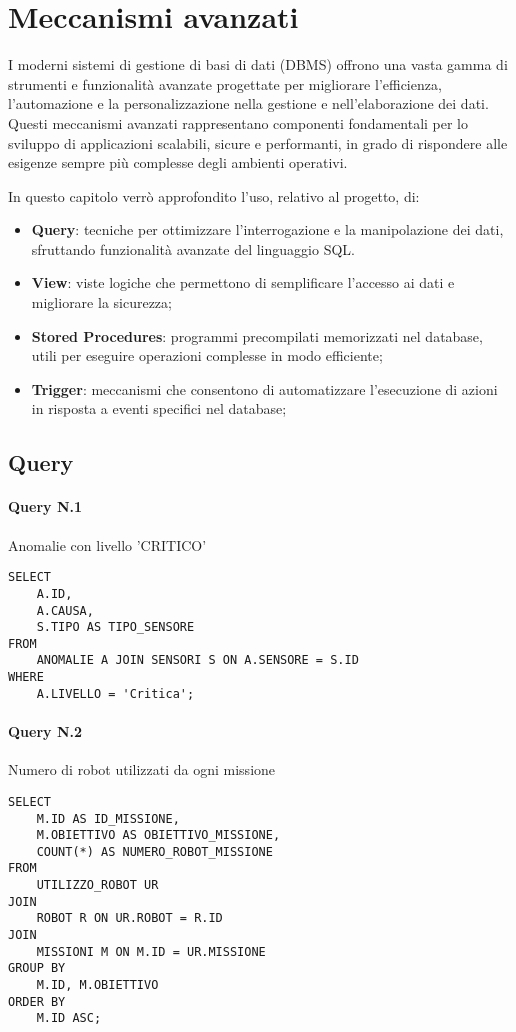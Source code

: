 \section{Meccanismi avanzati}

I moderni sistemi di gestione di basi di dati (DBMS) offrono una vasta gamma di strumenti e funzionalità avanzate progettate per migliorare l'efficienza, l'automazione e la personalizzazione nella gestione e nell'elaborazione dei dati. Questi meccanismi avanzati rappresentano componenti fondamentali per lo sviluppo di applicazioni scalabili, sicure e performanti, in grado di rispondere alle esigenze sempre più complesse degli ambienti operativi.

In questo capitolo verrò approfondito l'uso, relativo al progetto, di:
\begin{itemize}
    \item \textbf{Query}: tecniche per ottimizzare l'interrogazione e la manipolazione dei dati, sfruttando funzionalità avanzate del linguaggio SQL.
    \item \textbf{View}: viste logiche che permettono di semplificare l'accesso ai dati e migliorare la sicurezza;
    \item \textbf{Stored Procedures}: programmi precompilati memorizzati nel database, utili per eseguire operazioni complesse in modo efficiente;
    \item \textbf{Trigger}: meccanismi che consentono di automatizzare l'esecuzione di azioni in risposta a eventi specifici nel database;
\end{itemize}

\subsection{Query}

\paragraph{Query N.1}Anomalie con livello 'CRITICO'
\begin{lstlisting}
SELECT 
    A.ID, 
    A.CAUSA, 
    S.TIPO AS TIPO_SENSORE
FROM 
    ANOMALIE A JOIN SENSORI S ON A.SENSORE = S.ID
WHERE 
    A.LIVELLO = 'Critica';
\end{lstlisting}

\paragraph{Query N.2}Numero di robot utilizzati da ogni missione
\begin{lstlisting}
SELECT 
    M.ID AS ID_MISSIONE,
    M.OBIETTIVO AS OBIETTIVO_MISSIONE,
    COUNT(*) AS NUMERO_ROBOT_MISSIONE
FROM 
    UTILIZZO_ROBOT UR 
JOIN 
    ROBOT R ON UR.ROBOT = R.ID
JOIN 
    MISSIONI M ON M.ID = UR.MISSIONE
GROUP BY 
    M.ID, M.OBIETTIVO
ORDER BY 
    M.ID ASC;
\end{lstlisting}

